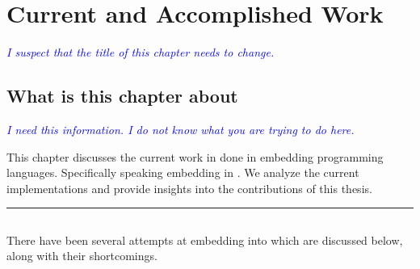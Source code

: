 \documentclass[thesis-solanki.tex]{subfiles}
\begin{document}
\chapter{Current and Accomplished Work}\label{chap:proposedWork}

\textcolor{blue}{\textsl{I suspect that the title of this chapter needs to change.}}

\section{What is this chapter about}

\textcolor{blue}{\textsl{I need this information.
    I do not know what you are trying to do here.
}}

This chapter discusses the current work in done in embedding programming languages. Specifically speaking embedding  in 
. We analyze the current implementations and provide insights into the contributions of this thesis. 

\noindent\rule{\textwidth}{0.5pt}


\section{}

There have been several attempts at embedding  into  which are
discussed below{\large,} along with their shortcomings.
\end{document}
